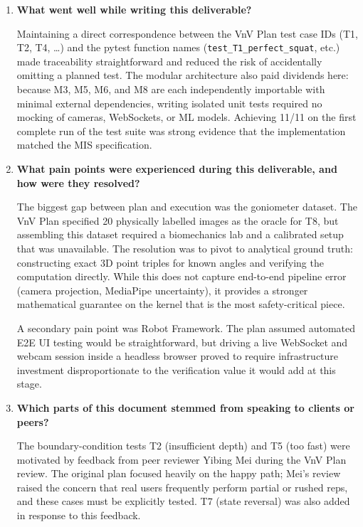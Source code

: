 \documentclass[12pt, titlepage]{article}
\begin{document}


\begin{enumerate}

  \item \textbf{What went well while writing this deliverable?}

  Maintaining a direct correspondence between the VnV Plan test case IDs
  (T1, T2, T4, \ldots) and the pytest function names
  (\texttt{test\_T1\_perfect\_squat}, etc.) made traceability straightforward
  and reduced the risk of accidentally omitting a planned test. The modular
  architecture also paid dividends here: because M3, M5, M6, and M8 are each
  independently importable with minimal external dependencies, writing isolated
  unit tests required no mocking of cameras, WebSockets, or ML models.
  Achieving 11/11 on the first complete run of the test suite was strong
  evidence that the implementation matched the MIS specification.

  \item \textbf{What pain points were experienced during this deliverable, and
    how were they resolved?}

  The biggest gap between plan and execution was the goniometer dataset. The
  VnV Plan specified 20 physically labelled images as the oracle for T8, but
  assembling this dataset required a biomechanics lab and a calibrated setup
  that was unavailable. The resolution was to pivot to analytical ground truth:
  constructing exact 3D point triples for known angles and verifying the
  computation directly. While this does not capture end-to-end pipeline error
  (camera projection, MediaPipe uncertainty), it provides a stronger
  mathematical guarantee on the kernel that is the most safety-critical piece.

  A secondary pain point was Robot Framework. The plan assumed automated E2E
  UI testing would be straightforward, but driving a live WebSocket and webcam
  session inside a headless browser proved to require infrastructure investment
  disproportionate to the verification value it would add at this stage.

  \item \textbf{Which parts of this document stemmed from speaking to
    clients or peers?}

  The boundary-condition tests T2 (insufficient depth) and T5 (too fast) were
  motivated by feedback from peer reviewer Yibing Mei during the VnV Plan
  review. The original plan focused heavily on the happy path; Mei's review
  raised the concern that real users frequently perform partial or rushed reps,
  and these cases must be explicitly tested. T7 (state reversal) was also added
  in response to this feedback.


\end{enumerate}
\end{document}
